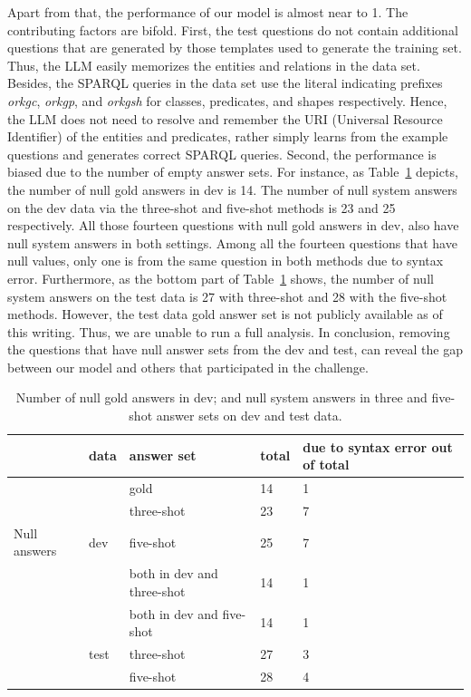 \documentclass[
]{ceurart}
\begin{document}
Apart from that, the performance of our model is almost near to 1. The contributing factors are bifold. First, the test questions do not contain additional questions that are generated by those templates used to generate the training set. Thus, the LLM easily memorizes the entities and relations in the data set. Besides, the SPARQL queries in the data set use the literal indicating prefixes \textit{orkgc}, \textit{orkgp}, and \textit{orkgsh} for classes, predicates, and shapes respectively. Hence, the LLM does not need to resolve and remember the URI (Universal Resource Identifier) of the entities and predicates, rather simply learns from the example questions and generates correct SPARQL queries. Second, the performance is biased due to the number of empty answer sets. For instance, as Table~\ref{tab:count_nulls} depicts, the number of null gold answers in dev is 14. The number of null system answers on the dev data via the three-shot and five-shot methods is 23 and 25 respectively. All those fourteen questions with null gold answers in dev, also have null system answers in both settings. Among all the fourteen questions that have null values, only one is from the same question in both methods due to syntax error. Furthermore, as the bottom part of Table~\ref{tab:count_nulls} shows, the number of null system answers on the test data is 27 with three-shot and 28 with the five-shot methods. However, the test data gold answer set is not publicly available as of this writing. Thus, we are unable to run a full analysis. In conclusion, removing the questions that have null answer sets from the dev and test, can reveal the gap between our model and others that participated in the challenge.

\begin{table}
  \caption{Number of null gold answers in dev; and null system answers in three and five-shot answer sets on dev and test data.}
  \label{tab:count_nulls}
  \begin{tabular}{lllll}
    \toprule
   & data & answer set & total & due to syntax error out of total\\
    \midrule
    & & gold & 14 & 1 \\
   & & three-shot & 23 & 7 \\
   Null answers & dev  & five-shot & 25 & 7  \\
    & & both in dev and three-shot & 14 & 1\\
     & & both in dev and five-shot & 14 & 1\\
    \midrule
     & test & three-shot & 27 & 3\\
      & & five-shot & 28 & 4 \\
    \bottomrule
  \end{tabular}
\end{table}
\end{document}
